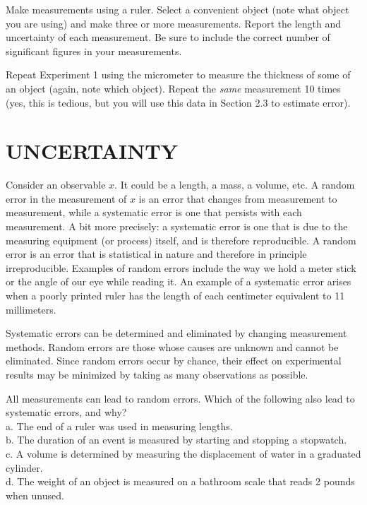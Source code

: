 \documentclass[11pt,letterpaper]{article}
\newcounter{question}[section]
\begin{document}
\clearpage
\question{} Make measurements using a ruler. Select a convenient object (note what object you are using) and make three or more measurements. Report the length and uncertainty of each measurement. Be sure to include the correct number of significant figures in your measurements.
\vspace{6cm}


\question{} Repeat Experiment 1 using the micrometer to measure the thickness of some of an object (again, note which object). Repeat the \textit{same} measurement 10 times (yes, this is tedious, but you will use this data in Section 2.3 to estimate error).



\section{UNCERTAINTY}
Consider an observable $x$. It could be a length, a mass, a volume, etc. A random error in the measurement of $x$
is an error that changes from measurement to measurement, while a
systematic error is one that persists with each measurement.  A bit
more precisely:  a systematic error is one that is due to the
measuring equipment (or process) itself, and is therefore
reproducible.  A random error is an error that is
statistical in nature and therefore in principle irreproducible.
Examples of random errors include the way we hold a meter stick or the
angle of our eye while reading it.  An example of a systematic error
arises when a poorly printed ruler has the length of each centimeter
equivalent to 11 millimeters.

Systematic errors can be determined and eliminated by changing measurement methods.  Random errors are those whose causes are unknown and cannot be eliminated.  Since random errors occur by chance, their effect on experimental results may be minimized by taking as many observations as possible.

\question{} All measurements can lead to random errors. Which of the following also lead to systematic errors, and why?\\
a. The end of a ruler was used in measuring lengths.\\
b. The duration of an event is measured by starting and stopping a stopwatch.\\
c. A volume is determined by measuring the displacement of water in a
graduated cylinder.\\
d. The weight of an object is measured on a bathroom scale that reads 2 pounds when unused.\\
\vspace{6cm}
\end{document}
